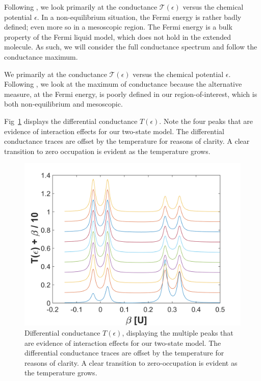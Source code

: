 \documentclass{article}
\begin{document}
\begin{multicols}{2}
        Following \citet{meir}, we look primarily at the conductance $\mathscr{T}(\epsilon)$ versus the chemical potential $\epsilon$. In a non-equilibrium situation, the Fermi energy is rather badly defined; even more so in a mesoscopic region. The Fermi energy is a bulk property of the Fermi liquid model, which does not hold in the extended molecule. As such, we will consider the full conductance spectrum and follow the conductance maximum.
        
        We primarily at the conductance $\mathscr{T}(\epsilon)$ versus the chemical potential $\epsilon$. Following \citet{meir}, we look at the maximum of conductance because the alternative measure, at the Fermi energy, is poorly defined in our region-of-interest, which is both non-equilibrium and mesoscopic. 
        
        Fig~\ref{fig:transplot} displays the differential conductance $T(\epsilon)$. Note the four peaks that are evidence of interaction effects for our two-state model. The differential conductance traces are offset by the temperature for reasons of clarity. A clear transition to zero occupation is evident as the temperature grows.
        
        \begin{figure}[b]
            \centering
            \includegraphics[width=\textwidth]{figBigFont/transport.png}
            \caption{\label{fig:transplot} Differential conductance $T(\epsilon)$, displaying the multiple peaks that are evidence of interaction effects for our two-state model. The differential conductance traces are offset by the temperature for reasons of clarity. A clear transition to zero-occupation is evident as the temperature grows.}
        \end{figure}
        

\end{multicols}
\end{document}
